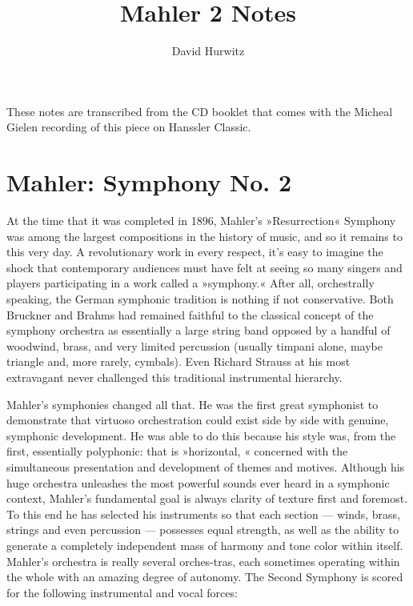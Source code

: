 \documentclass[12pt]{article}%
\begin{document}
\title{Mahler 2 Notes}
\author{David Hurwitz}
\date{}
\maketitle

\noindent
These notes are transcribed from the CD booklet that comes with the Micheal Gielen recording of this piece on Hanssler Classic.

\section{Mahler: Symphony No. 2}

At the time that it was completed in 1896, Mahler's »Resurrection« Symphony was among the largest compositions in the history of music, and so it remains to this very day. A revolutionary work in every respect, it's easy to imagine the shock that contemporary audiences must have felt at seeing so many singers and players participating in a work called a
»symphony.« After all, orchestrally speaking, the German symphonic tradition is nothing if not conservative. Both Bruckner and Brahms had remained faithful to the classical concept of the symphony orchestra as essentially a large string band opposed by a handful of woodwind, brass, and very limited percussion (usually timpani alone, maybe triangle and, more rarely, cymbals). Even Richard Strauss at his most extravagant never challenged this traditional instrumental hierarchy.

Mahler's symphonies changed all that. He was the first great symphonist to demonstrate that virtuoso orchestration could exist side by side with genuine, symphonic development. He was able to do this because his style was, from the first, essentially polyphonic: that is »horizontal, « concerned with the simultaneous presentation and development of themes and motives. Although his huge orchestra unleashes the most powerful sounds ever heard in a symphonic context, Mahler's fundamental goal is always clarity of texture first and foremost. To this end he has selected his instruments so that each section --- winds, brass, strings and even percussion --- possesses equal strength, as well as the ability to generate a completely independent mass of harmony and tone color within itself. Mahler's orchestra is really several orches-tras, each sometimes operating within the whole with an amazing degree of autonomy.
\newpage
The Second Symphony is scored for the following instrumental and vocal forces:
\end{document}
